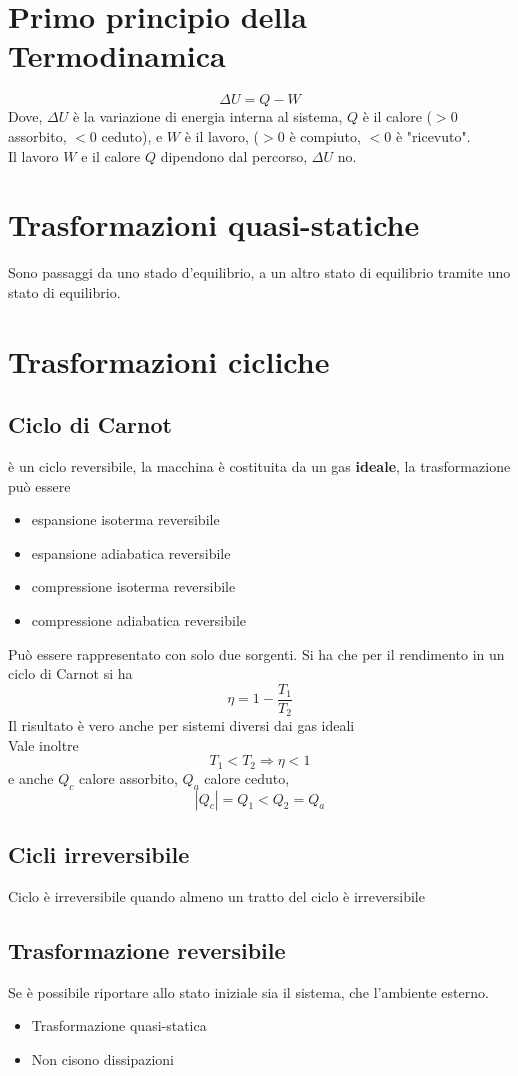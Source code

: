 \documentclass[a4paper]{report}
\begin{document}
  \section{Primo principio della Termodinamica}
  $$ \Delta U = Q - W $$
  Dove, $\Delta U$ è la variazione di energia interna al sistema, $Q$ è il calore ($>0$ assorbito, $<0$ ceduto), e $W$ è il lavoro, ($>0$ è compiuto, $<0$ è "ricevuto".\\
  Il lavoro $W$ e il calore $Q$ dipendono dal percorso, $\Delta U$ no.

  \section{Trasformazioni quasi-statiche}
  Sono passaggi da uno stado d'equilibrio, a un altro stato di equilibrio tramite uno stato di equilibrio.

  \section{Trasformazioni cicliche}
  \subsection{Ciclo di Carnot}
  è un ciclo reversibile, la macchina è costituita da un gas \textbf{ideale}, la trasformazione può essere
  \begin{itemize}
    \item espansione isoterma reversibile
    \item espansione adiabatica reversibile
    \item compressione isoterma reversibile
    \item compressione adiabatica reversibile
  \end{itemize}
  Può essere rappresentato con solo due sorgenti. Si ha che per il rendimento in un ciclo di Carnot si ha
  $$ \eta = 1 - \frac{T_1}{T_2}$$
  Il risultato è vero anche per sistemi diversi dai gas ideali \\
  Vale inoltre
  $$ T_1 < T_2 \Rightarrow \eta < 1 $$
  e anche $Q_c$ calore assorbito, $Q_a$ calore ceduto,
  $$ |Q_c| = Q_1 < Q_2 = Q_a $$

  \subsection{Cicli irreversibile}
  Ciclo è irreversibile quando almeno un tratto del ciclo è irreversibile

  \subsection{Trasformazione reversibile}
  Se è possibile riportare allo stato iniziale sia il sistema, che l'ambiente esterno.
  \begin{itemize}
    \item Trasformazione quasi-statica
    \item Non cisono dissipazioni
  \end{itemize}
\end{document}
